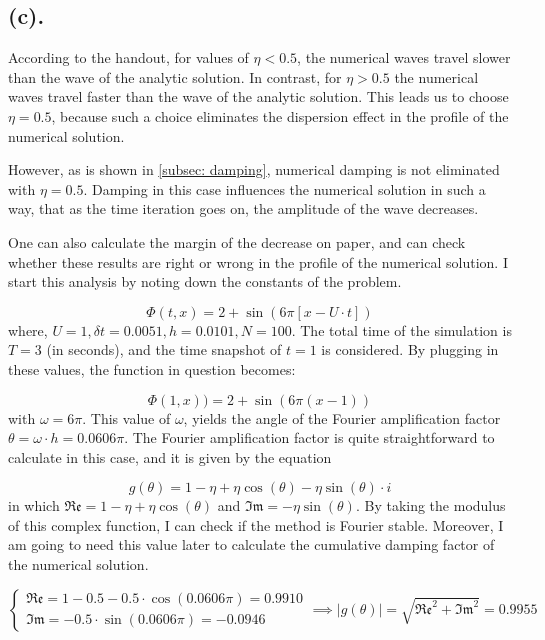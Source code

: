
\subsection{(c).}
According to the handout, for values of \( \eta < 0.5 \), the numerical waves travel slower than the wave of the analytic solution. In contrast, for \( \eta > 0.5 \) the numerical waves travel faster than the wave of the analytic solution. This leads us to choose \( \eta = 0.5 \), because such a choice eliminates the dispersion effect in the profile of the numerical solution.

However, as is shown in \ref{subsec: damping}, numerical damping is not eliminated with \( \eta = 0.5 \). Damping in this case influences the numerical solution in such a way, that as the time iteration goes on, the amplitude of the wave decreases.

One can also calculate the margin of the decrease on paper, and can check whether these results are right or wrong in the profile of the numerical solution. I start this analysis by noting down the constants of the problem.

\[
	\Phi(t,x) = 2 + \sin\left(6 \pi [x - U\cdot t]\right)
\]
where, \( U = 1, \delta t = 0.0051, h = 0.0101, N = 100 \). The total time of the simulation is \( T = 3 \) (in seconds), and the time snapshot of \( t = 1 \) is considered. By plugging in these values, the function in question becomes:

\[
	\Phi(1, x)) = 2 + \sin \left(6 \pi (x - 1) \right)
\]
with \( \omega = 6 \pi \). This value of \( \omega \), yields the angle of the Fourier amplification factor \( \theta = \omega \cdot h = 0.0606 \pi \). The Fourier amplification factor is quite straightforward to calculate in this case, and it is given by the equation

\[
	g(\theta) = 1 - \eta + \eta \cos(\theta) - \eta \sin(\theta) \cdot i
\]
in which \( \mathfrak{Re} = 1 - \eta + \eta \cos(\theta) \) and \( \mathfrak{Im} = - \eta \sin(\theta) \). By taking the modulus of this complex function, I can check if the method is Fourier stable. Moreover, I am going to need this value later to calculate the cumulative damping factor of the numerical solution.

\[
	\begin{cases}
		\mathfrak{Re} = 1 - 0.5 - 0.5 \cdot \cos(0.0606\pi) = 0.9910 \\
		\mathfrak{Im} = -0.5 \cdot \sin(0.0606\pi) = -0.0946 
	\end{cases} 
	\implies |g(\theta)| = \sqrt{\mathfrak{Re}^2 + \mathfrak{Im}^2} = 0.9955
\]

